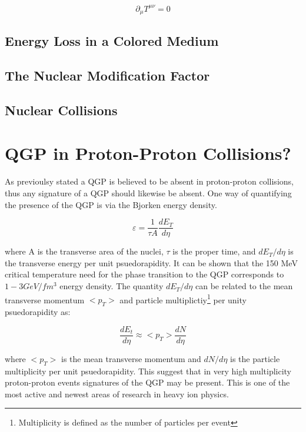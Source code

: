 \begin{equation}
\partial_{\mu} T^{\mu \nu} = 0
\label{eq:hydroenrgy}
\end{equation}

\subsection{Energy Loss in a Colored Medium}

\subsection{The Nuclear Modification Factor}

\subsection{Nuclear Collisions}


\section{QGP in Proton-Proton Collisions?}
As previoulsy stated a QGP is believed to be absent in proton-proton collisions, thus any signature of a QGP should likewise be absent.  One way of quantifying the presence of the QGP is via the Bjorken energy density.  

\begin{equation}
\varepsilon = \frac{1}{\tau A} \frac{dE_{T}}{d \eta}
\label{eq:bjorkenEt}
\end{equation}

\noindent
where A is the transverse area of the nuclei, $\tau$ is the proper time, and $dE_{T}/d \eta$ is the transverse energy per unit psuedorapidity.  It can be shown that  the 150 MeV critical temperature need for the phase transition to the QGP corresponds to ~ $1 - 3 GeV/fm^{3}$ energy density.  The quantity $dE_{T}/d \eta$ can be related to the mean transverse momentum $<p_{T}>$ and particle multiplictiy\footnote{Multiplicity is defined as the number of particles per event} per unity psuedorapidity as:

\begin{equation}
\frac{dE_{t}}{d \eta}  \approx  <p_{T}> \frac{dN}{d\eta}
\label{eq:Et}
\end{equation}

where $ <p_{T} >$ is the mean transverse momentum and $dN/d\eta$ is the particle multiplicity per unit psuedorapidity.
This suggest that in very high multiplicity proton-proton events signatures of the QGP may be present.  This is one of the most active and newest areas of research in heavy ion physics.  